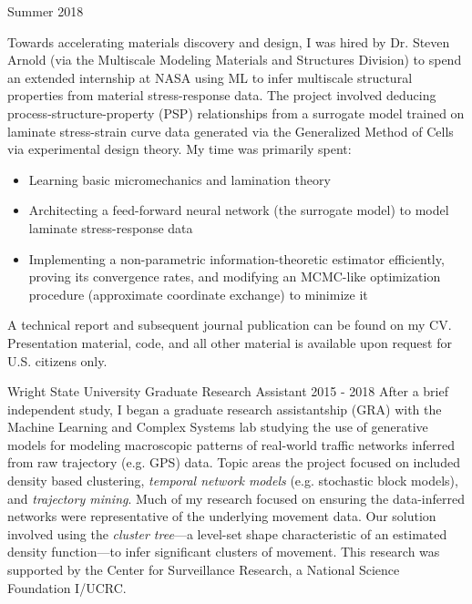 \documentclass[11pt,a4paper,sans]{moderncv} %
\begin{document}
			 {Summer 2018}{}{\vspace{3pt}
Towards accelerating materials discovery and design, I was hired by Dr. Steven Arnold (via the Multiscale Modeling Materials and Structures Division) to spend an extended internship at NASA using ML to infer multiscale structural properties from material stress-response data.  
The project involved deducing process-structure-property (PSP) relationships from a surrogate model trained on laminate stress-strain curve data generated via the Generalized Method of Cells via experimental design theory.
My time was primarily spent:
\begin{itemize}
	\item Learning basic micromechanics and lamination theory
	\item Architecting a feed-forward neural network (the surrogate model) to model laminate stress-response data 
	\item Implementing a non-parametric information-theoretic estimator efficiently, proving its convergence rates, and modifying an MCMC-like optimization procedure (approximate coordinate exchange) to minimize it 
\end{itemize}	
A technical report and subsequent journal publication can be found on my CV. Presentation material, code, and all other material is available upon request for U.S. citizens only. 
}
\vspace{0.75em}

			 {Wright State University}
			 {Graduate Research Assistant}
			 {2015 - 2018}{}
{  \vspace{3pt}
After a brief independent study, I began a graduate research assistantship (GRA) with the Machine Learning and Complex Systems lab studying the use of generative models for modeling macroscopic patterns of real-world traffic networks inferred from raw trajectory (e.g. GPS) data.
Topic areas the project focused on included density based clustering, {\em temporal network models } (e.g. stochastic block models), and {\em trajectory mining}.
Much of my research focused on ensuring the data-inferred networks were representative of the underlying movement data. Our solution involved using the {\em cluster tree}---a level-set shape characteristic of an estimated density function---to infer significant clusters of movement. This research was supported by the Center for Surveillance Research, a National Science Foundation I/UCRC.
}
\vspace{0.75em}
\end{document}

